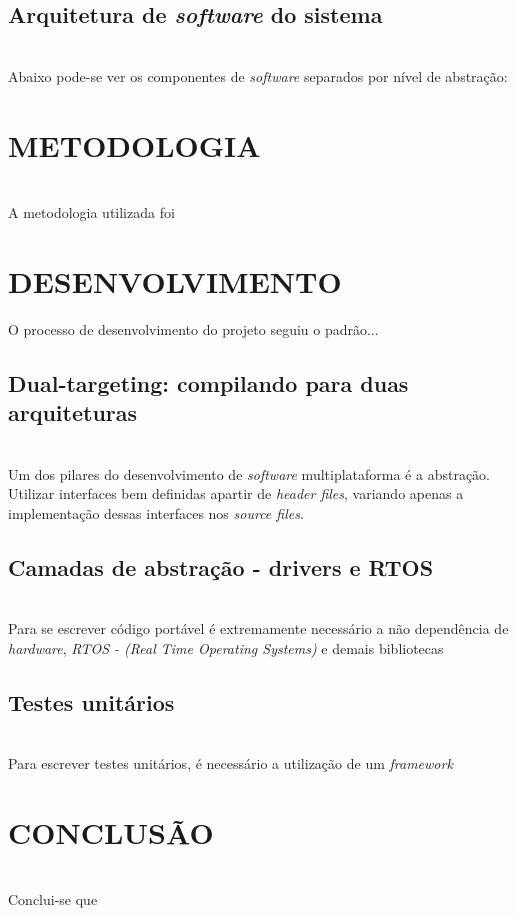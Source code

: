 \documentclass[times, twoside, watermark]{artigo}
\begin{document}
\subsection{Arquitetura de \textit{software} do sistema}\hfill\\
Abaixo pode-se ver os componentes de \textit{software} separados por nível de abstração:


\section*{METODOLOGIA}\hfill\\
A metodologia utilizada foi


\section*{DESENVOLVIMENTO}
\setcounter{section}{-1}
O processo de desenvolvimento do projeto seguiu o padrão...

\subsection{Dual-targeting: compilando para duas arquiteturas}\hfill\\
Um dos pilares do desenvolvimento de \textit{software} multiplataforma é a abstração.
Utilizar interfaces bem definidas apartir de \textit{header files}, variando apenas
a implementação dessas interfaces nos \textit{source files}.

\subsection{Camadas de abstração - drivers e RTOS}\hfill\\
Para se escrever código portável é extremamente necessário a não dependência de 
\textit{hardware}, \textit{RTOS - (Real Time Operating Systems)} e demais bibliotecas

\subsection{Testes unitários}\hfill\\
Para escrever testes unitários, é necessário a utilização de um \textit{framework}


\section*{CONCLUSÃO}\hfill\\
Conclui-se que 


\section*{}


\cite{martin2009clean}
\cite{martin2018clean}
\cite{denardin2019sistemas}
\end{document}
